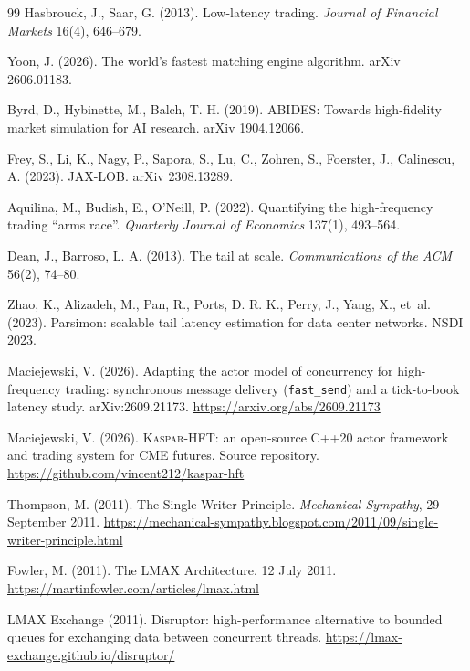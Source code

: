 \documentclass[11pt]{article}
\newcommand{\kasparhft}{\textsc{Kaspar-HFT}}
\begin{document}
\begin{thebibliography}{99}
Hasbrouck, J., Saar, G. (2013). Low-latency trading. \textit{Journal of Financial
Markets} 16(4), 646--679.

Yoon, J. (2026). The world's fastest matching engine algorithm. arXiv 2606.01183.

Byrd, D., Hybinette, M., Balch, T. H. (2019). ABIDES: Towards high-fidelity market
simulation for AI research. arXiv 1904.12066.

Frey, S., Li, K., Nagy, P., Sapora, S., Lu, C., Zohren, S., Foerster, J., Calinescu, A.
(2023). JAX-LOB. arXiv 2308.13289.

Aquilina, M., Budish, E., O'Neill, P. (2022). Quantifying the high-frequency trading
``arms race''. \textit{Quarterly Journal of Economics} 137(1), 493--564.

Dean, J., Barroso, L. A. (2013). The tail at scale. \textit{Communications of the ACM}
56(2), 74--80.

Zhao, K., Alizadeh, M., Pan, R., Ports, D. R. K., Perry, J., Yang, X., et~al. (2023).
Parsimon: scalable tail latency estimation for data center networks. NSDI 2023.

Maciejewski, V. (2026). Adapting the actor model of concurrency for high-frequency
trading: synchronous message delivery (\texttt{fast\_send}) and a tick-to-book latency
study. arXiv:2609.21173. \url{https://arxiv.org/abs/2609.21173}

Maciejewski, V. (2026). \kasparhft: an open-source C++20 actor framework and trading
system for CME futures. Source repository. \url{https://github.com/vincent212/kaspar-hft}

Thompson, M. (2011). The Single Writer Principle. \textit{Mechanical Sympathy}, 29
September 2011.
\url{https://mechanical-sympathy.blogspot.com/2011/09/single-writer-principle.html}

Fowler, M. (2011). The LMAX Architecture. 12 July 2011.
\url{https://martinfowler.com/articles/lmax.html}

LMAX Exchange (2011). Disruptor: high-performance alternative to bounded queues for
exchanging data between concurrent threads.
\url{https://lmax-exchange.github.io/disruptor/}


\end{thebibliography}
\end{document}

